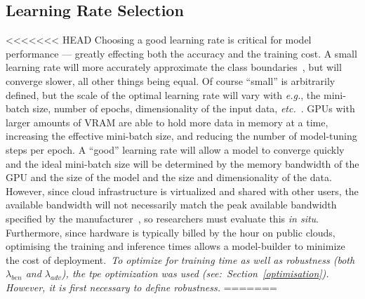 \documentclass[sn-mathphys-num]{sn-jnl}%
\newcommand{\cm}[1]{\textit{{\color{blue}#1}}}
\begin{document}
\subsection{Learning Rate Selection}
\label{learning_rate}

<<<<<<< HEAD
Choosing a good learning rate is critical for model performance --- greatly effecting both the accuracy and the training cost. A small learning rate will more accurately approximate the class boundaries~\cite{cao2019generalization}, but will converge slower, all other things being equal. Of course ``small'' is arbitrarily defined, but the scale of the optimal learning rate will vary with \textit{e.g.}, the mini-batch size, number of epochs, dimensionality of the input data, \textit{etc.}~\cite{granziol2022learning}. GPUs with larger amounts of VRAM are able to hold more data in memory at a time, increasing the effective mini-batch size, and reducing the number of model-tuning steps per epoch. A ``good'' learning rate will allow a model to converge quickly~\cite{smith2019super,granziol2022learning} and the ideal mini-batch size will be determined by the memory bandwidth of the GPU and the size of the model and the size and dimensionality of the data. However, since cloud infrastructure is virtualized and shared with other users, the available bandwidth will not necessarily match the peak available bandwidth specified by the manufacturer~\cite{sajid2013cloud}, so researchers must evaluate this \textit{in situ}. Furthermore, since hardware is typically billed by the hour on public clouds, optimising the training and inference times allows a model-builder to minimize the cost of deployment.~\cm{To optimize for training time as well as robustness (both $\lambda_{ben}$ and $\lambda_{adv}$), the \acrshort{tpe} optimization was used (see:~Section~\ref{optimisation}). However, it is first necessary to define robustness.}
=======
\end{document}
